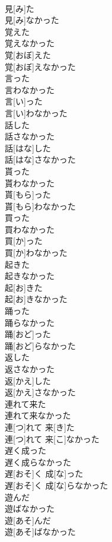 \documentclass[8pt]{extreport}
\begin{document}
\begin{CJK}{UTF8}{min}
\\	見[み]た 
\\	見[み]なかった
\\	覚えた 
\\	覚えなかった	
\\	覚[おぼ]えた 
\\	覚[おぼ]えなかった
\\	言った 
\\	言わなかった	
\\	言[い]った 
\\	言[い]わなかった
\\	話した 
\\	話さなかった	
\\	話[はな]した 
\\	話[はな]さなかった
\\	貰った 
\\	貰わなかった	
\\	貰[もら]った 
\\	貰[もら]わなかった
\\	買った 
\\	買わなかった	
\\	買[か]った 
\\	買[か]わなかった
\\	起きた 
\\	起きなかった	
\\	起[お]きた 
\\	起[お]きなかった
\\	踊った 
\\	踊らなかった	
\\	踊[おど]った 
\\	踊[おど]らなかった
\\	返した 
\\	返さなかった	
\\	返[かえ]した 
\\	返[かえ]さなかった
\\	連れて来た 
\\	連れて来なかった	
\\	連[つ]れて 来[き]た 
\\	連[つ]れて 来[こ]なかった
\\	遅く成った 
\\	遅く成らなかった	
\\	遅[おそ]く 成[な]った 
\\	遅[おそ]く 成[な]らなかった
\\	遊んだ 
\\	遊ばなかった	
\\	遊[あそ]んだ 
\\	遊[あそ]ばなかった

\end{CJK}
\end{document}
